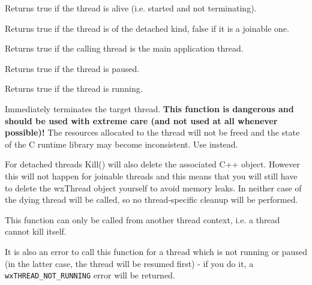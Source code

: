\label{wxthreadisalive}


Returns true if the thread is alive (i.e. started and not terminating).

\label{wxthreadisdetached}


Returns true if the thread is of the detached kind, false if it is a joinable one.

\label{wxthreadismain}


Returns true if the calling thread is the main application thread.

\label{wxthreadispaused}


Returns true if the thread is paused.

\label{wxthreadisrunning}


Returns true if the thread is running.

\label{wxthreadkill}


Immediately terminates the target thread. {\bf This function is dangerous and should
be used with extreme care (and not used at all whenever possible)!} The resources
allocated to the thread will not be freed and the state of the C runtime library
may become inconsistent. Use  instead.

For detached threads Kill() will also delete the associated C++ object.
However this will not happen for joinable threads and this means that you will
still have to delete the wxThread object yourself to avoid memory leaks.
In neither case  of the dying thread will be
called, so no thread-specific cleanup will be performed.

This function can only be called from another thread context, i.e. a thread
cannot kill itself.

It is also an error to call this function for a thread which is not running or
paused (in the latter case, the thread will be resumed first) - if you do it,
a {\tt wxTHREAD\_NOT\_RUNNING} error will be returned.

